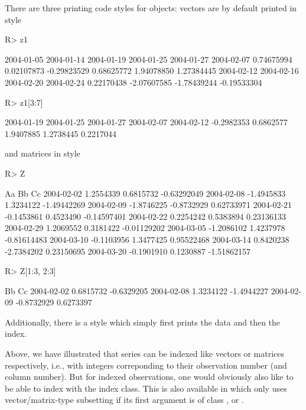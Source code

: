 \documentclass{Z}
\begin{document}
There are three printing code styles for  objects: vectors are by default
printed in  style
\begin{Schunk}
\begin{Sinput}
R> z1
\end{Sinput}
\begin{Soutput}
 2004-01-05  2004-01-14  2004-01-19  2004-01-25  2004-01-27  2004-02-07 
 0.74675994  0.02107873 -0.29823529  0.68625772  1.94078850  1.27384445 
 2004-02-12  2004-02-16  2004-02-20  2004-02-24 
 0.22170438 -2.07607585 -1.78439244 -0.19533304 
\end{Soutput}
\begin{Sinput}
R> z1[3:7]
\end{Sinput}
\begin{Soutput}
2004-01-19 2004-01-25 2004-01-27 2004-02-07 2004-02-12 
-0.2982353  0.6862577  1.9407885  1.2738445  0.2217044 
\end{Soutput}
\end{Schunk}
and matrices in  style
\begin{Schunk}
\begin{Sinput}
R> Z
\end{Sinput}
\begin{Soutput}
                   Aa         Bb          Cc
2004-02-02  1.2554339  0.6815732 -0.63292049
2004-02-08 -1.4945833  1.3234122 -1.49442269
2004-02-09 -1.8746225 -0.8732929  0.62733971
2004-02-21 -0.1453861  0.4523490 -0.14597401
2004-02-22  0.2254242  0.5383894  0.23136133
2004-02-29  1.2069552  0.3181422 -0.01129202
2004-03-05 -1.2086102  1.4237978 -0.81614483
2004-03-10 -0.1103956  1.3477425  0.95522468
2004-03-14  0.8420238 -2.7384202  0.23150695
2004-03-20 -0.1901910  0.1230887 -1.51862157
\end{Soutput}
\begin{Sinput}
R> Z[1:3, 2:3]
\end{Sinput}
\begin{Soutput}
                   Bb         Cc
2004-02-02  0.6815732 -0.6329205
2004-02-08  1.3234122 -1.4944227
2004-02-09 -0.8732929  0.6273397
\end{Soutput}
\end{Schunk}
Additionally, there is a  style which simply first prints the data 
and then the index.

Above, we have illustrated that  series can be indexed like vectors
or matrices respectively, i.e., with integers correponding to their observation
number (and column number). But for indexed observations, one would obviously also
like to be able to index with the index class. This is also available in \code{[}
which only uses vector/matrix-type subsetting if its first argument is of class
,  or .
\end{document}
